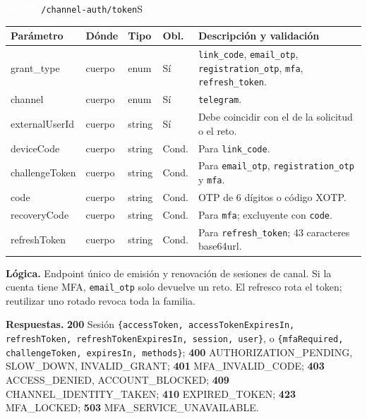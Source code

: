\documentclass[11pt,a4paper]{report}
\newcommand{\verbo}[2]{\colorbox{#1}{\textcolor{white}{\ttfamily\bfseries\small #2}}}
\begin{document}
\begin{apiendpoint}{\verbo{verbpost}{POST}\ \texttt{/\allowbreak{}channel-auth/\allowbreak{}token}}{S}
\begin{tabularx}{\linewidth}{@{}>{\ttfamily\raggedright}p{3.0cm}p{1.35cm}p{1.9cm}p{0.9cm}X@{}}
\toprule \normalfont\bfseries Parámetro & \bfseries Dónde & \bfseries Tipo & \bfseries Obl. & \bfseries Descripción y validación\\ \midrule
grant\_type & cuerpo & enum & Sí & \texttt{link\_code}, \texttt{email\_otp}, \texttt{registration\_otp}, \texttt{mfa}, \texttt{refresh\_token}.\\
channel & cuerpo & enum & Sí & \texttt{telegram}.\\
externalUserId & cuerpo & string & Sí & Debe coincidir con el de la solicitud o el reto.\\
deviceCode & cuerpo & string & Cond. & Para \texttt{link\_code}.\\
challengeToken & cuerpo & string & Cond. & Para \texttt{email\_otp}, \texttt{registration\_otp} y \texttt{mfa}.\\
code & cuerpo & string & Cond. & OTP de 6 dígitos o código XOTP.\\
recoveryCode & cuerpo & string & Cond. & Para \texttt{mfa}; excluyente con \texttt{code}.\\
refreshToken & cuerpo & string & Cond. & Para \texttt{refresh\_token}; 43 caracteres base64url.\\
\bottomrule\end{tabularx}
\par\smallskip\textbf{Lógica.} Endpoint único de emisión y renovación de sesiones de canal. Si la cuenta tiene MFA, \texttt{email\_otp} solo devuelve un reto. El refresco rota el token; reutilizar uno rotado revoca toda la familia.
\par\smallskip\textbf{Respuestas.} \textbf{200} Sesión \texttt{\{accessToken,\allowbreak{} accessTokenExpiresIn,\allowbreak{} refreshToken,\allowbreak{} refreshTokenExpiresIn,\allowbreak{} session,\allowbreak{} user\}}, o \texttt{\{mfaRequired,\allowbreak{} challengeToken,\allowbreak{} expiresIn,\allowbreak{} methods\}}; \textbf{400} AUTHORIZATION\_PENDING, SLOW\_DOWN, INVALID\_GRANT; \textbf{401} MFA\_INVALID\_CODE; \textbf{403} ACCESS\_DENIED, ACCOUNT\_BLOCKED; \textbf{409} CHANNEL\_IDENTITY\_TAKEN; \textbf{410} EXPIRED\_TOKEN; \textbf{423} MFA\_LOCKED; \textbf{503} MFA\_SERVICE\_UNAVAILABLE.
\end{apiendpoint}
\end{document}

